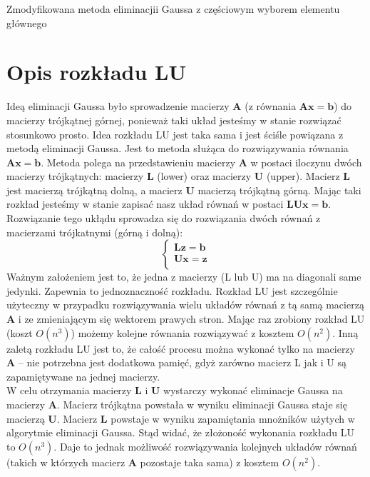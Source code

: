 \documentclass[]{article}
\newcommand{\mA}{\bm{A}}
\newcommand{\mL}{\bm{L}}
\newcommand{\mU}{\bm{U}}
\newcommand{\vb}{\bm{b}}
\newcommand{\vx}{\bm{x}}
\begin{document}
\begin{algorithm}[h]
{			\KwRet \X\;
		}
		\caption{Zmodyfikowana metoda eliminacjii Gaussa z częściowym wyborem elementu głównego}
	\end{algorithm} 
	
	
	\clearpage
	\section*{Opis rozkładu LU}
	
	Ideą eliminacji Gaussa było sprowadzenie macierzy $\mA$ (z równania $\mA\vx=\vb$) do macierzy trójkątnej górnej, ponieważ taki układ jesteśmy w stanie rozwiązać stosunkowo prosto. Idea rozkładu LU jest taka sama i jest ściśle powiązana z metodą eliminacji Gaussa. Jest to metoda służąca do rozwiązywania równania $\mA\vx=\vb$. Metoda polega na przedstawieniu macierzy $\mA$ w postaci iloczynu dwóch macierzy trójkątnych: macierzy $\mL$ (lower) oraz macierzy $\mU$ (upper). Macierz $\mL$ jest macierzą trójkątną dolną, a macierz $\mU$ macierzą trójkątną górną. Mając taki rozkład jesteśmy w stanie zapisać nasz układ równań w postaci $\mL\mU\vx=\vb$. Rozwiązanie tego ukłądu sprowadza się do rozwiązania dwóch równań z macierzami trójkatnymi (górną i dolną):
	$$\left\{
	\begin{array}{ll}
		\mL \bm{z}= \vb\\
		\mU \vx= \bm{z} \\
	\end{array}
	\right.$$
	Ważnym założeniem jest to, że jedna z macierzy (L lub U) ma na diagonali same jedynki. Zapewnia to jednoznaczność rozkładu. Rozkład LU jest szczególnie użyteczny w przypadku rozwiązywania wielu układów równań z tą samą macierzą $\mA$ i ze zmieniającym się wektorem prawych stron. Mając raz zrobiony rozkład LU (koszt $O(n^3)$) możemy kolejne równania rozwiązywać z kosztem $O(n^2)$.
	Inną zaletą rozkładu LU jest to, że całość procesu można wykonać tylko na macierzy $\mA$ -- nie potrzebna jest dodatkowa pamięć, gdyż zarówno macierz L jak i U są zapamiętywane na jednej macierzy.\\
	W celu otrzymania macierzy  $\mL$ i $\mU$ wystarczy wykonać eliminacje Gaussa na macierzy $\mA$. Macierz trójkątna powstała w wyniku eliminacji Gaussa staje się macierzą $\mU$. Macierz  $\mL$ powstaje w wyniku zapamiętania mnożników użytych w algorytmie eliminacji Gaussa. Stąd widać, że złożoność wykonania rozkładu LU to $O(n^3)$. Daje to jednak możliwość rozwiązywania kolejnych układów równań (takich w którzych macierz $\mA$ pozostaje taka sama) z kosztem $O(n^2)$.
	
\end{document}
